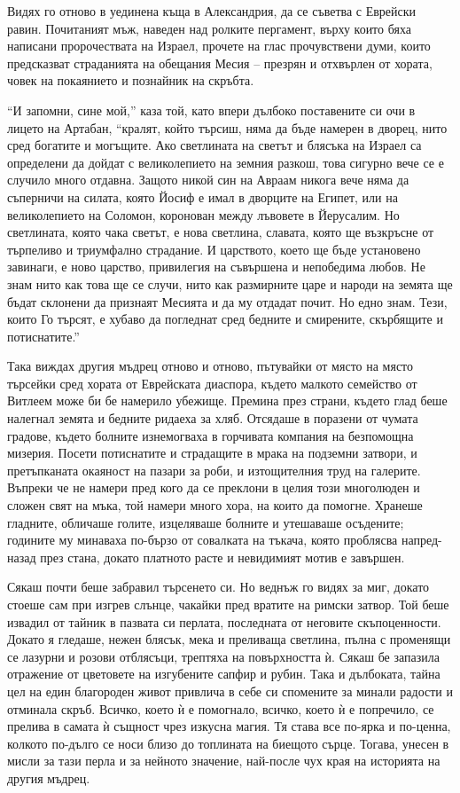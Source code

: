 \documentclass[oneside,10pt]{memoir}
\begin{document}
Видях го отново в уединена къща в Александрия, да се съветва с Еврейски равин.
Почитаният мъж, наведен над ролките пергамент, върху които бяха написани
пророчествата на Израел, прочете на глас прочувствени думи, които предсказват
страданията на обещания Месия -- презрян и отхвърлен от хората, човек на
покаянието и познайник на скръбта.

``И запомни, сине мой,'' каза той, като впери дълбоко поставените си очи в
лицето на Артабан, ``кралят, който търсиш, няма да бъде намерен в дворец, нито
сред богатите и могъщите. Ако светлината на светът и блясъка на Израел са
определени да дойдат с великолепието на земния разкош, това сигурно вече се е
случило много отдавна. Защото никой син на Авраам никога вече няма да съперничи
на силата, която Йосиф е имал в дворците на Египет, или на великолепието на
Соломон, коронован между лъвовете в Йерусалим. Но светлината, която чака светът,
е нова светлина, славата, която ще възкръсне от търпеливо и триумфално
страдание. И царството, което ще бъде установено завинаги, е ново царство,
привилегия на съвършена и непобедима любов. Не знам нито как това ще се случи,
нито как размирните царе и народи на земята ще бъдат склонени да признаят
Месията и да му отдадат почит. Но едно знам. Тези, които Го търсят, е хубаво да
погледнат сред бедните и смирените, скърбящите и потиснатите.''

Така виждах другия мъдрец отново и отново, пътувайки от място на място търсейки
сред хората от Еврейската диаспора, където малкото семейство от Витлеем може би
бе намерило убежище. Премина през страни, където глад беше налегнал земята и
бедните ридаеха за хляб. Отсядаше в поразени от чумата градове, където болните
изнемогваха в горчивата компания на безпомощна мизерия. Посети потиснатите и
страдащите в мрака на подземни затвори, и претъпканата окаяност на пазари за
роби, и изтощителния труд на галерите. Въпреки че не намери пред кого да се
преклони в целия този многолюден и сложен свят на мъка, той намери много хора,
на които да помогне. Хранеше гладните, обличаше голите, изцеляваше болните и
утешаваше осъдените; годините му минаваха по-бързо от совалката на тъкача, която
проблясва напред-назад през стана, докато платното расте и невидимият мотив е
завършен.

Сякаш почти беше забравил търсенето си. Но веднъж го видях за миг, докато стоеше
сам при изгрев слънце, чакайки пред вратите на римски затвор. Той беше извадил
от тайник в пазвата си перлата, последната от неговите скъпоценности. Докато я
гледаше, нежен блясък, мека и преливаща светлина, пълна с променящи се лазурни и
розови отблясъци, трептяха на повърхността ѝ. Сякаш бе запазила отражение от
цветовете на изгубените сапфир и рубин. Така и дълбоката, тайна цел на един
благороден живот привлича в себе си спомените за минали радости и отминала
скръб. Всичко, което ѝ е помогнало, всичко, което ѝ е попречило, се прелива в
самата ѝ същност чрез изкусна магия. Тя става все по-ярка и по-ценна, колкото
по-дълго се носи близо до топлината на биещото сърце. Тогава, унесен в мисли за
тази перла и за нейното значение, най-после чух края на историята на другия
мъдрец.
\end{document}
